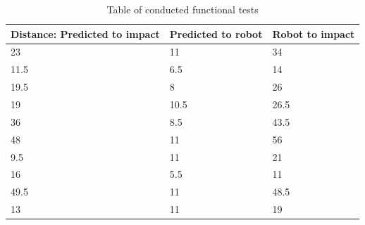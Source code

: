 \begin{table}
	\begin{center}
		\begin{tabular}{ | p{5cm} | p{5cm} | p{5cm} |}
			\hline
			\textbf{Distance: Predicted to impact} & \textbf{Predicted to robot} & \textbf{Robot to impact} \\ \hline
			23 & 11 & 34 \\ \hline
			11.5 & 6.5 & 14 \\ \hline
			19.5 & 8 & 26 \\ \hline
			19 & 10.5 & 26.5 \\ \hline
			36 & 8.5 & 43.5 \\ \hline
			48 & 11 & 56 \\ \hline
			9.5 & 11 & 21 \\ \hline
			16 & 5.5 & 11 \\ \hline
			49.5 & 11 & 48.5 \\ \hline
			13 & 11 & 19 \\ \hline
			
		\end{tabular}
		\caption{Table of conducted functional tests}
		\label{table:FuncTest}
	\end{center}
\end{table}